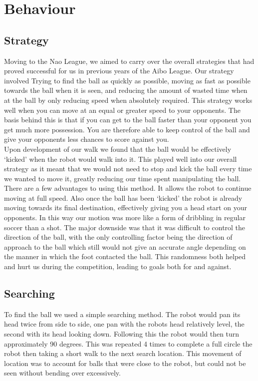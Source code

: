 \section{Behaviour}
\label{Behaviour}
\subsection{Strategy}
Moving to the Nao League, we aimed to carry over the overall strategies that had proved successful for us in previous years of the Aibo League. Our strategy involved Trying to find the ball as quickly as possible, moving as fast as possible towards the ball when it is seen, and reducing the amount of wasted time when at the ball by only reducing speed when absolutely required. This strategy works well when you can move at an equal or greater speed to your opponents. The basis behind this is that if you can get to the ball faster than your opponent you get much more possession. You are therefore able to keep control of the ball and give your opponents less chances to score against you.\\

Upon development of our walk we found that the ball would be effectively `kicked' when the robot would walk into it. This played well into our overall strategy as it meant that we would not need to stop and kick the ball every time we wanted to move it, greatly reducing our time spent manipulating the ball. There are a few advantages to using this method. It allows the robot to continue moving at full speed. Also once the ball has been `kicked' the robot is already moving towards its final destination, effectively giving you a head start on your opponents. In this way our motion was more like a form of dribbling in regular soccer than a shot. The major downside was that it was difficult to control the direction of the ball, with the only controlling factor being the direction of approach to the ball which still would not give an accurate angle depending on the manner in which the foot contacted the ball. This randomness both helped and hurt us during the competition, leading to goals both for and against.\\

\subsection{Searching}
To find the ball we used a simple searching method. The robot would pan its head twice from side to side, one pan with the robots head relatively level, the second with its head looking down. Following this the robot would then turn approximately 90 degrees. This was repeated 4 times to complete a  full circle the robot then taking a short walk to the next search location. This movement of location was to account for balls that were close to the robot, but could not be seen without bending over excessively.\\

